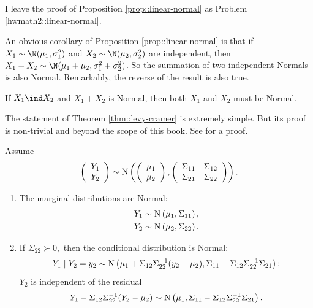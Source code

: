 I leave the proof of Proposition \ref{prop::linear-normal} as Problem \ref{hwmath2::linear-normal}.




An obvious corollary of Proposition \ref{prop::linear-normal} is that if $X_1 \sim \N(\mu_1, \sigma_1^2)$ and $X_2 \sim \N(\mu_2, \sigma_2^2)$ are independent, then $X_1+X_2 \sim \N(  \mu_1 + \mu_2,  \sigma_1^2 + \sigma_2^2 )$. So the summation of two independent Normals is also Normal. Remarkably, the reverse of the result is also true. 

\begin{theorem}
\label{thm::levy-cramer}
 If $X_1 \ind X_2$ and $X_1 + X_2$ is Normal, then both $X_1$ and $X_2$ must be Normal.
\end{theorem}


The statement of Theorem \ref{thm::levy-cramer} is extremely simple. But its proof is non-trivial and beyond the scope of this book. See \citet{benhamou2018three} for a proof. 



\begin{theorem}
Assume 
\[
\left(\begin{array}{c}
Y_{1}\\
Y_{2}
\end{array}\right)\sim\textup{N}\left(\left(\begin{array}{c}
\mu_{1}\\
\mu_{2}
\end{array}\right),\left(\begin{array}{cc}
\Sigma_{11} & \Sigma_{12}\\
\Sigma_{21} & \Sigma_{22}
\end{array}\right)\right).
\]
\begin{enumerate}
\item The marginal distributions are Normal:
\begin{align*}
Y_{1} & \sim\textup{N}\left(\mu_{1},\Sigma_{11}\right),\\
Y_{2} & \sim\textup{N}\left(\mu_{2},\Sigma_{22}\right).
\end{align*}
\item If $\Sigma_{22}\succ0,$ then the conditional distribution is Normal:
\[
Y_{1}\mid Y_{2}=y_{2}\sim\textup{N}\left(\mu_{1}+\Sigma_{12}\Sigma_{22}^{-1}(y_{2}-\mu_{2}),\Sigma_{11}-\Sigma_{12}\Sigma_{22}^{-1}\Sigma_{21}\right);
\]
$Y_{2}$ is independent of the residual 
\[
Y_{1}-\Sigma_{12}\Sigma_{22}^{-1}(Y_{2}-\mu_{2})\sim\textup{N}\left(\mu_{1},\Sigma_{11}-\Sigma_{12}\Sigma_{22}^{-1}\Sigma_{21}\right).
\]
\end{enumerate}
\end{theorem}



